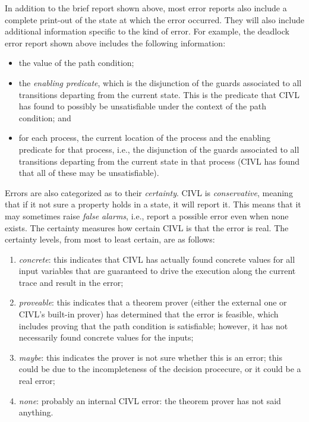 In addition to the brief report shown above, most error reports
also include a complete print-out of the state at which the error
occurred.  They will also include additional information specific
to the kind of error.  For example, the deadlock error report shown
above includes the following information:
\begin{itemize}
\item the value of the path condition;
\item the \emph{enabling predicate}, which is the disjunction of the
  guards associated to all transitions departing from the current
  state. This is the predicate that CIVL has found to possibly be
  unsatisfiable under the context of the path condition; and
\item for each process, the current location of the process and the
  enabling predicate for that process, i.e., the disjunction of the
  guards associated to all transitions departing from the current
  state in that process (CIVL has found that all of these may be
  unsatisfiable).
\end{itemize}

Errors are also categorized as to their \emph{certainty}.  CIVL is
\emph{conservative}, meaning that if it not sure a property holds in a
state, it will report it.  This means that it may sometimes raise
\emph{false alarms}, i.e., report a possible error even when none
exists. The certainty measures how certain CIVL is that the error is
real.  The certainty levels, from most to least certain, are as
follows:
\begin{enumerate}
\item \emph{concrete}: this indicates that CIVL has actually found
  concrete
  values for all input variables that are guaranteed to drive the
  execution along the current trace and result in the error;
\item \emph{proveable}: this indicates that a theorem prover (either
  the external one or CIVL's built-in prover) has determined that
  the error is feasible, which includes proving that the path condition
  is satisfiable; however, it has not necessarily found concrete
  values for the inputs;
\item \emph{maybe}: this indicates the prover is not sure whether this
  is an error; this could be due to the incompleteness of the decision
  procecure, or it could be a real error;
\item \emph{none}: probably an internal CIVL error: the theorem prover
  has not said anything.
\end{enumerate}

